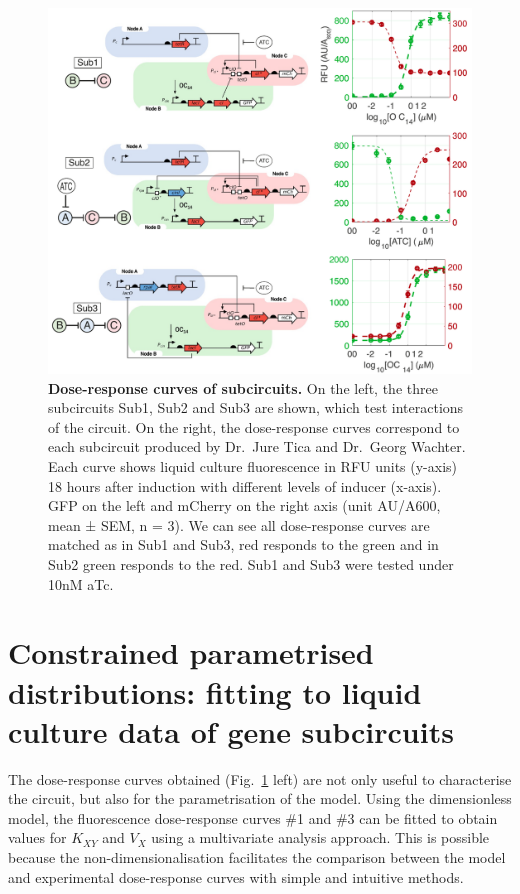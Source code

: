 \begin{figure}[H] %
    \centering
    \begin{adjustbox}{center}
        \includegraphics[width=1\textwidth]{chapters/Chapter 2/dose_response_experimental} %
    \end{adjustbox}
    \caption{\textbf{Dose-response curves of subcircuits.}
    On the left, the three subcircuits Sub1, Sub2 and Sub3 are shown, which test interactions of the circuit. On the right, the dose-response curves correspond to each subcircuit produced by Dr.~Jure Tica and Dr.~Georg Wachter. Each curve shows liquid culture fluorescence in RFU units (y-axis) 18 hours after induction with different levels of inducer (x-axis).
    GFP on the left and mCherry on the right axis (unit AU/A600, mean ± SEM, n = 3). We can see all dose-response curves are matched as in Sub1 and Sub3, red responds to the green and in Sub2 green responds to the red. Sub1 and Sub3 were tested under 10nM aTc.}
    \label{fig:dose_response_experimental} %
\end{figure}
\section{Constrained parametrised distributions:
fitting to liquid culture data of gene subcircuits}\label{Constrained parametrised distributions: fitting to liquid culture data of gene subcircuits}
The dose-response curves obtained (Fig.~\ref{fig:dose_response_experimental} left)
are not only useful to characterise the circuit,
but also for the parametrisation of the model.
Using the dimensionless model,
the fluorescence dose-response curves \#1 and \#3 can be fitted
to obtain values for $K_{XY}$ and $V_{X}$ using a multivariate analysis approach.
This is possible because the non-dimensionalisation facilitates the comparison between the model and experimental dose-response curves with simple and intuitive methods.



